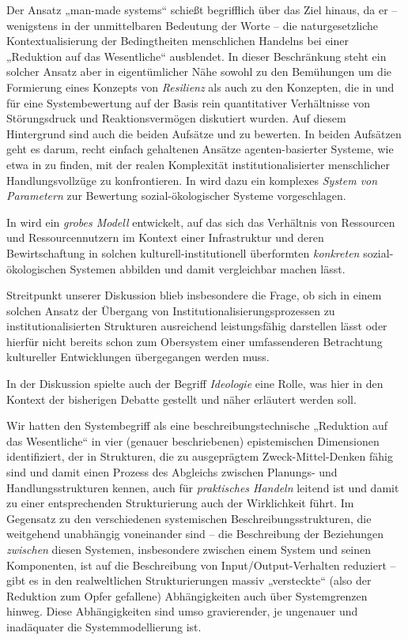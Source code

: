 \documentclass[11pt,a4paper]{article}
\begin{document}
Der Ansatz „man-made systems“ schießt begriff\-lich über das Ziel hinaus, da
er -- wenigstens in der unmittelbaren Bedeutung der Worte -- die
naturgesetzliche Kontextualisierung der Bedingtheiten menschlichen Handelns
bei einer „Reduktion auf das Wesentliche“ ausblendet. In dieser Beschränkung
steht ein solcher Ansatz aber in eigentümlicher Nähe sowohl zu den Bemühungen
um die Formierung eines Konzepts von \emph{Resilienz} als auch zu den
Konzepten, die in \cite{Ashby1958} und \cite{Boisot2011} für eine
Systembewertung auf der Basis rein quantitativer Verhältnisse von
Störungsdruck und Reaktionsvermögen diskutiert wurden.  Auf diesem Hintergrund
sind auch die beiden Aufsätze \cite{Ostrom2007} und \cite{Anderies2004} zu
bewerten. In beiden Aufsätzen geht es darum, recht einfach gehaltenen Ansätze
agenten-basierter Systeme, wie etwa in \cite{Holland2006} zu finden, mit der
realen Komplexität institutionalisierter menschlicher Handlungsvollzüge zu
konfrontieren.  In \cite{Ostrom2007} wird dazu ein komplexes \emph{System von
  Parametern} zur Bewertung sozial-ökologischer Systeme vorgeschlagen.

In \cite{Anderies2004} wird ein \emph{grobes Modell} entwickelt, auf das sich
das Verhältnis von Ressourcen und Ressourcennutzern im Kontext einer
Infrastruktur und deren Bewirtschaftung in solchen kulturell-institutionell
überformten \emph{konkreten} sozial-ökologischen Systemen abbilden und damit
vergleichbar machen lässt.

Streitpunkt unserer Diskussion blieb insbesondere die Frage, ob sich in einem
solchen Ansatz der Übergang von Institutionalisierungsprozessen zu
institutionalisierten Strukturen ausreichend leistungsfähig darstellen lässt
oder hierfür nicht bereits schon zum Obersystem einer umfassenderen
Betrachtung kultureller Entwicklungen übergegangen werden muss.

In der Diskussion spielte auch der Begriff \emph{Ideologie} eine Rolle, was
hier in den Kontext der bisherigen Debatte gestellt und näher erläutert werden
soll.

Wir hatten den Systembegriff als eine beschreibungstechnische „Reduktion auf
das Wesentliche“ in vier (genauer beschriebenen) epistemischen Dimensionen
identifiziert, der in Strukturen, die zu ausgeprägtem Zweck-Mittel-Denken
fähig sind und damit einen Prozess des Abgleichs zwischen Planungs- und
Handlungsstrukturen kennen, auch für \emph{praktisches Handeln} leitend ist
und damit zu einer entsprechenden Strukturierung auch der Wirklichkeit
führt. Im Gegensatz zu den verschiedenen systemischen Beschreibungsstrukturen,
die weitgehend unabhängig voneinander sind -- die Beschreibung der Beziehungen
\emph{zwischen} diesen Systemen, insbesondere zwischen einem System und seinen
Komponenten, ist auf die Beschreibung von Input/Output-Verhalten reduziert --
gibt es in den realweltlichen Strukturierungen massiv „versteckte“ (also der
Reduktion zum Opfer gefallene) Abhängigkeiten auch über Systemgrenzen hinweg.
Diese Abhängigkeiten sind umso gravierender, je ungenauer und inadäquater die
Systemmodellierung ist.
\end{document}
